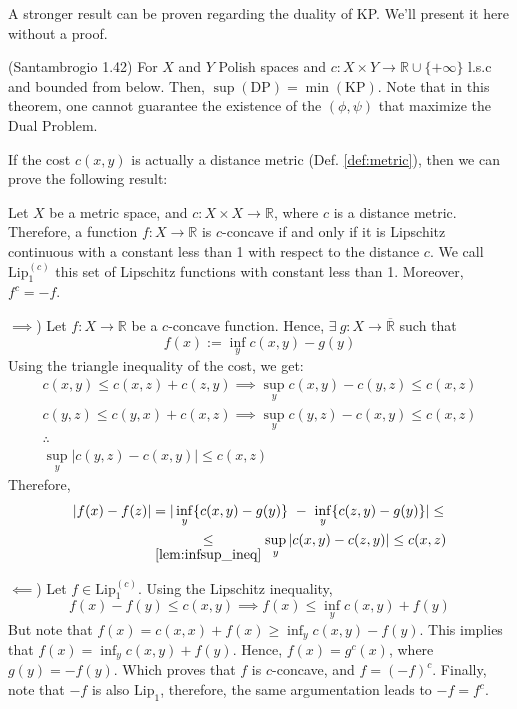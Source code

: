 \vspace{5mm}
A stronger result can be proven regarding the duality of KP. We'll present it here without a proof.
\begin{theorem}(Santambrogio 1.42)
  For $X$ and $Y$ Polish spaces and $c:X\times Y \to \mathbb R\cup \{+\infty\}$ l.s.c and bounded from below. Then,
  $\mathrm{\sup(DP)}=\mathrm{\min (KP)}$.
  Note that in this theorem, one cannot guarantee the existence of the $(\phi,\psi)$ that maximize the Dual Problem.
  \label{thm:strongerDuality}
\end{theorem}


If the cost $c(x,y)$ is actually a distance metric (Def. \ref{def:metric}),
then we can prove the following result:
\begin{theorem}
  Let $X$ be a metric space, and $c:X \times X \to \mathbb{R}$, where $c$ is a distance metric. Therefore,
  a function $f:X \to \mathbb{R}$ is $c$-concave if and only if it is Lipschitz continuous with a constant
  less than 1 with respect to the distance $c$.
  We call $\text{Lip}_1^{(c)}$ this set of Lipschitz functions with constant less than 1. Moreover,
  $f^c = -f$.
  \label{thm:cConcaveLip1}
\end{theorem}
\begin{prf}

  $\implies$) Let $f:X \to \mathbb R$ be a $c$-concave function. Hence, $\exists \ g:X \to \overline{\mathbb R}$ such that
  \begin{equation*}
    f(x) := \inf_y c(x,y) - g(y)
  \end{equation*}
  Using the triangle inequality of the cost, we get:
  \begin{gather*}
    c(x,y) \leq c(x,z) + c(z,y) \implies \sup_y c(x,y) - c(y,z) \leq c(x,z) \\
    c(y,z) \leq c(y,x) + c(x,z) \implies \sup_y c(y,z) - c(x,y) \leq c(x,z) \\
    \therefore \\
    \sup_y |c(y,z) - c(x,y)| \leq c(x,z)
  \end{gather*}
  Therefore,
  \begin{align*}
    |f(x) - f(z)| & = |\inf_y \{c(x,y) - g(y) \} \ - \ \inf_y \{c(z,y) - g(y)\}| \leq \\
                  & \underset{\ref{lem:infsup_ineq}}{\leq}
    \sup_y |c(x,y) - c(z,y)| \leq c(x,z)
  \end{align*}

  $\impliedby$) Let $f \in \text{Lip}^{(c)}_1$. Using the Lipschitz inequality,
  \begin{equation*}
    f(x) - f(y) \leq c(x,y) \implies f(x) \leq \inf_y c(x,y) + f(y)
  \end{equation*}
  But note that $f(x) = c(x,x) + f(x) \geq \inf_y c(x,y) - f(y)$. This implies that
  $f(x) = \inf_y c(x,y) + f(y)$. Hence, $f(x) = g^c(x)$, where $g(y) = -f(y)$. Which proves
  that $f$ is $c$-concave, and $f = (-f)^c$. Finally, note that $-f$ is also $\text{Lip}_1$,
  therefore, the same argumentation leads to $-f = f^c$.
\end{prf}
\vspace{5mm}

